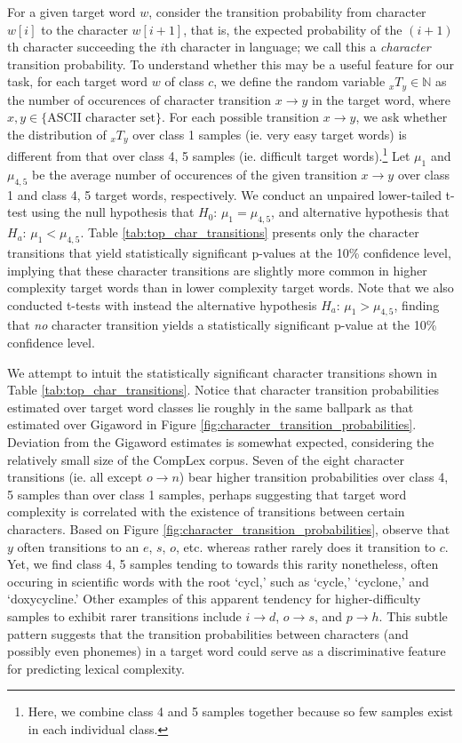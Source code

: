 \documentclass{dcthesis}
\theoremstyle{definition}
\theoremstyle{remark}
\begin{document}
For a given target word $w$, consider the transition probability from character $w[i]$ to the character $w[i+1]$, that is, the expected probability of the $(i+1)$th character succeeding the $i$th character in language; we call this a \textit{character} transition probability. To understand whether this may be a useful feature for our task, for each target word $w$ of class $c$, we define the random variable ${}_xT_y \in \mathbb{N}$ as the number of occurences of character transition $x \rightarrow y$ in the target word, where $x, y \in \{\text{ASCII character set}\}$. For each possible transition $x \rightarrow y$, we ask whether the distribution of ${}_xT_y$ over class 1 samples (ie. very easy target words) is different from that over class 4, 5 samples (ie. difficult target words).\footnote{Here, we combine class 4 and 5 samples together because so few samples exist in each individual class.} Let $\mu_1$ and $\mu_{4,5}$ be the average number of occurences of the given transition $x \rightarrow y$ over  class 1 and class 4, 5 target words, respectively. We conduct an unpaired lower-tailed t-test using the null hypothesis that $H_0\text{: } \mu_1 = \mu_{4,5}$, and alternative hypothesis that $H_a\text{: } \mu_1 < \mu_{4,5}$. Table \ref{tab:top_char_transitions} presents only the character transitions that yield statistically significant p-values at the 10\% confidence level, implying that these character transitions are slightly more common in higher complexity target words than in lower complexity target words. Note that we also conducted t-tests with instead the alternative hypothesis $H_a\text{: } \mu_1 > \mu_{4,5}$, finding that \textit{no} character transition yields a statistically significant p-value at the 10\% confidence level.

We attempt to intuit the statistically significant character transitions shown in Table \ref{tab:top_char_transitions}. Notice that character transition probabilities estimated over target word classes lie roughly in the same ballpark as that estimated over  Gigaword in Figure \ref{fig:character_transition_probabilities}. Deviation from the Gigaword estimates is somewhat expected, considering the relatively small size of the CompLex corpus. Seven of the eight character transitions (ie. all except $o \rightarrow n$) bear higher transition probabilities over class 4, 5 samples than over class 1 samples, perhaps suggesting that target word complexity is correlated with the existence of transitions between certain characters. Based on Figure \ref{fig:character_transition_probabilities}, observe that $y$ often transitions to an $e$, $s$, $o$, etc. whereas rather rarely does it transition to $c$. Yet, we find class 4, 5 samples tending to towards this rarity nonetheless, often occuring in scientific words with the root `cycl,' such as `cycle,' `cyclone,' and `doxycycline.' Other examples of this apparent tendency for higher-difficulty samples to exhibit rarer transitions include $i \rightarrow d$, $o \rightarrow s$, and $p \rightarrow h$. This subtle pattern suggests that the transition probabilities between characters (and possibly even phonemes) in a target word could serve as a discriminative feature for predicting lexical complexity.
\end{document}
